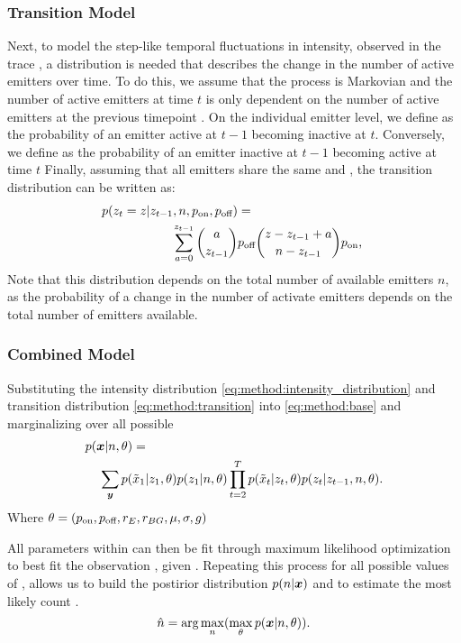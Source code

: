 \subsubsection{Transition Model}
Next, to model the step-like temporal fluctuations in intensity, observed in the trace \trace, 
a distribution is needed that describes the change in the number of active emitters \states over time. 
%
To do this, we assume that the process is Markovian and the number of active emitters  
at time $t$ is only dependent on the number of active emitters at the previous timepoint .
%
On the individual emitter level, we define \poff as the probability of an emitter active at $t-1$ becoming 
inactive at $t$. Conversely, we define \pon as the probability of an emitter inactive at $t-1$ becoming active at time $t$
%
Finally, assuming that all emitters share the same \poff and \pon, the transition distribution can be written as:
% 
\begin{align}
  \label{eq:method:transition}
  p(z_{t} = z | z_{t-1}, n, \pon, \poff) &=\\
	\sum_{a = 0}^{z_{t-1}}
    {a \choose z_{t-1}}
    &\poff
    {z - z_{t-1} + a \choose \n - z_{t-1}}
    \pon
    \text{,} \notag\
\end{align}
%
Note that this distribution depends on the total number of available emitters
$n$, as the probability of a change in the number of activate emitters
depends on the total number of emitters available.


\subsubsection{Combined Model}



Substituting the intensity distribution \eqref{eq:method:intensity_distribution} and transition distribution \eqref{eq:method:transition} 
into \eqref{eq:method:base} and marginalizing over all possible \states
% 
\begin{align}
  \label{eq:method:likelihood}
  p(\bm{x}|n,\theta) &=\\
    \sum_{\bm{y}}
      p(&\tilde{x}_{1}|z_{1}, \theta)
      p(z_{1}|n, \theta)
      \prod_{t=2}^{T}
        p(\tilde{x}_{t}|z_{t}, \theta)
        p(z_{t}|z_{t-1},n, \theta)
    \notag
  \text{.}
\end{align}
%
Where $\theta = (p_\text{on}, p_\text{off}, r_{E}, r_{BG}, \mu, \sigma, g)$

All parameters within \parameters can then be fit through maximum likelihood optimization to best fit the observation \trace, given \n. 
%
Repeating this process for all possible values of \n, allows us to build the postirior distribution $p(n | \bm{x})$ and to estimate the most likely count \estimatedn.
%
\begin{equation}
    \hat{n} =
    \text{arg}\max_{n}(
    \max_\theta
    p(\bm{x}|n,\theta))
  \text{.}
  \label{eq:method:optimization}
\end{equation}

